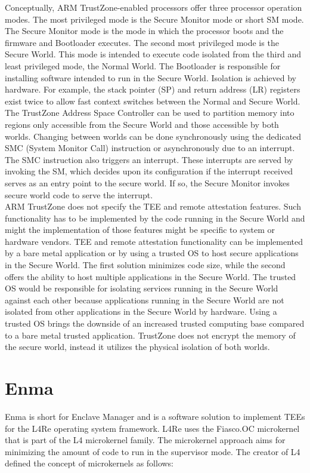 Conceptually, ARM TrustZone-enabled processors offer three processor operation
modes. The most privileged mode is the Secure Monitor mode or short SM mode. The
Secure Monitor mode is the mode in which the processor boots and the firmware
and Bootloader executes. The second most privileged mode is the Secure World.
This mode is intended to execute code isolated from the third and least
privileged mode, the Normal World. The Bootloader is responsible for installing
software intended to run in the Secure World. Isolation is achieved by hardware.
For example, the stack pointer (SP) and return address (LR) registers exist
twice to allow fast context switches between the Normal and Secure World. The
TrustZone Address Space Controller can be used to partition memory into regions
only accessible from the Secure World and those accessible by both worlds.
Changing between worlds can be done synchronously using the dedicated SMC
(System Monitor Call) instruction or asynchronously due to an interrupt. The SMC
instruction also triggers an interrupt. These interrupts are served by invoking
the SM, which decides upon its configuration if the interrupt received serves as
an entry point to the secure world. If so, the Secure Monitor invokes secure
world code to serve the interrupt.\\

ARM TrustZone does not specify the TEE and remote attestation features. Such
functionality has to be implemented by the code running in the Secure World and
might the implementation of those features might be specific to system or
hardware vendors. TEE and remote attestation functionality can be implemented by
a bare metal application or by using a trusted OS to host secure applications in
the Secure World. The first solution minimizes code size, while the second
offers the ability to host multiple applications in the Secure World. The
trusted OS would be responsible for isolating services running in the Secure
World against each other because applications running in the Secure World are
not isolated from other applications in the Secure World by hardware. Using a
trusted OS brings the downside of an increased trusted computing base compared
to a bare metal trusted application. TrustZone does not encrypt the memory of
the secure world, instead it utilizes the physical isolation of both worlds.\\

\section{Enma}
\label{sec:20:enma}
Enma is short for Enclave Manager and is a software solution to implement TEEs
for the L4Re operating system framework. \cite{reitz_isolierende_2019} L4Re uses
the Fiasco.OC microkernel that is part of the L4 microkernel family. The
microkernel approach aims for minimizing the amount of code to run in the
supervisor mode. The creator of L4 defined the concept of microkernels as
follows:


